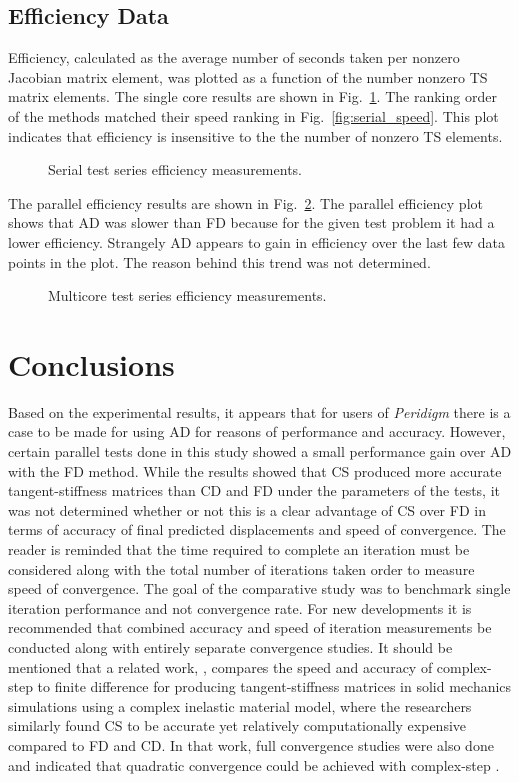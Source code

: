 \documentclass[preprint,12pt]{elsarticle}
\begin{document}
\subsection{Efficiency Data}
Efficiency, calculated as the average number of seconds taken per nonzero Jacobian matrix element, was plotted as a function of the number nonzero TS matrix elements. The single core results are shown in Fig.~\ref{fig:serial_efficiency}.  The ranking order of the methods
matched their speed ranking in Fig.~\ref{fig:serial_speed}. This plot indicates that efficiency is insensitive to the the number of nonzero TS elements.  
%
\begin{figure}[tbp]
  \centering
  \scalebox{1.0}{}
  \caption{Serial test series efficiency measurements.}
  \label{fig:serial_efficiency}
\end{figure}
%
The parallel efficiency results are shown in Fig.~\ref{fig:multi_efficiency}. The parallel efficiency plot shows that AD was slower than FD because for the given test problem it had a lower efficiency. Strangely AD appears to gain in efficiency over the last few data points in the plot. The reason behind this trend was not determined.
%
\begin{figure}[tbp]
  \centering
  \scalebox{1.0}{}
  \caption{Multicore test series efficiency measurements.}
  \label{fig:multi_efficiency}
\end{figure}


\section{Conclusions}
%
Based on the experimental results, it appears that for users of \emph{Peridigm}
there is a case to be made for using AD for reasons of performance and
accuracy. However, certain parallel tests done in this study showed a small
performance gain over AD with the FD method.  While the results showed that CS
produced more accurate tangent-stiffness matrices than CD and FD under the
parameters of the tests, it was not determined whether or not this is a clear
advantage of CS over FD in terms of accuracy of final predicted displacements
and speed of convergence. The reader is reminded that the time required to
complete an iteration must be considered along with the total number of
iterations taken order to measure speed of convergence. The goal of the
comparative study was to benchmark single iteration performance and not
convergence rate. For new developments it is recommended that combined accuracy
and speed of iteration measurements be conducted along with entirely separate
convergence studies. It should be mentioned that a related work,
\cite{perez2012numerical}, compares the speed and accuracy of complex-step to
finite difference for producing tangent-stiffness matrices in solid mechanics
simulations using a complex inelastic material model, where the researchers
similarly found CS to be accurate yet relatively computationally expensive
compared to FD and CD. In that work, full convergence studies were also done
and indicated that quadratic convergence could be achieved with complex-step
 \cite[p.28]{perez2012numerical}.
\end{document}
